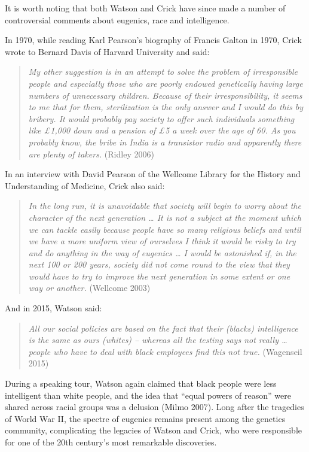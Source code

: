 \documentclass[
]{book}
\begin{document}
It is worth noting that both Watson and Crick have since made a number of controversial comments about eugenics, race and intelligence.

In 1970, while reading Karl Pearson's biography of Francis Galton in 1970, Crick wrote to Bernard Davis of Harvard University and said:

\begin{quote}
\emph{My other suggestion is in an attempt to solve the problem of irresponsible people and especially those who are poorly endowed genetically having large numbers of unnecessary children. Because of their irresponsibility, it seems to me that for them, sterilization is the only answer and I would do this by bribery. It would probably pay society to offer such individuals something like £1,000 down and a pension of £5 a week over the age of 60. As you probably know, the bribe in India is a transistor radio and apparently there are plenty of takers.} (Ridley 2006)
\end{quote}

In an interview with David Pearson of the Wellcome Library for the History and Understanding of Medicine, Crick also said:

\begin{quote}
\emph{In the long run, it is unavoidable that society will begin to worry about the character of the next generation \ldots{} It is not a subject at the moment which we can tackle easily because people have so many religious beliefs and until we have a more uniform view of ourselves I think it would be risky to try and do anything in the way of eugenics \ldots{} I would be astonished if, in the next 100 or 200 years, society did not come round to the view that they would have to try to improve the next generation in some extent or one way or another.} (Wellcome 2003)
\end{quote}

And in 2015, Watson said:

\begin{quote}
\emph{All our social policies are based on the fact that their (blacks) intelligence is the same as ours (whites) -- whereas all the testing says not really \ldots{} people who have to deal with black employees find this not true.} (Wagenseil 2015)
\end{quote}

During a speaking tour, Watson again claimed that black people were less intelligent than white people, and the idea that ``equal powers of reason'' were shared across racial groups was a delusion (Milmo 2007). Long after the tragedies of World War II, the spectre of eugenics remains present among the genetics community, complicating the legacies of Watson and Crick, who were responsible for one of the 20th century's most remarkable discoveries.
\end{document}
